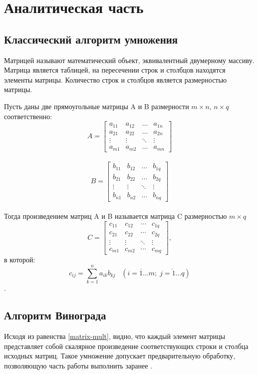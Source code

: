 \chapter{Аналитическая часть}

\section{Классический алгоритм умножения}
Матрицей называют математический объект, эквивалентный двумерному массиву. Матрица является таблицей, на пересечении строк и столбцов находятся элементы матрицы. Количество строк и столбцов является размерностью матрицы.

Пусть даны две прямоугольные матрицы A и B размерности $m \times n$, $n \times q$
соответственно:\\
$$A =  \begin{bmatrix} 
	a_{11}& a_{12} &\ldots & a_{1n}\\ 
	a_{21}& a_{22} &\ldots & a_{2n}\\ 
	\vdots& \vdots &\ddots & \vdots\\ 
	a_{m1}& a_{m2} &\ldots & a_{mn} 
\end{bmatrix} $$\\	

$$B = \begin{bmatrix} 
	b_{11}& b_{12} &\ldots & b_{1q}\\ 
	b_{21}& b_{22} &\ldots & b_{2q}\\ 
	\vdots& \vdots &\ddots & \vdots\\ 
	b_{n1}& b_{n2} &\ldots & b_{nq} 
\end{bmatrix} $$\\

Тогда произведением матриц A и B называется матрица C размерностью  $m \times q$ 
$$
	C = \begin{bmatrix} 
		c_{11} & c_{12} & \cdots & c_{1q} \\
		c_{21} & c_{22} & \cdots & c_{2q} \\ 
		\vdots & \vdots & \ddots & \vdots \\ 
		c_{m1} & c_{m2} & \cdots & c_{mq}	
	\end{bmatrix},
$$
в которой:
\begin{equation}
	\label{matrix-mult}
	c_{ij} = \sum_{k=1}^{n} a_{ik}b_{kj} \;\;\; \left(\overline{i = 1 \ldots m};\;\overline{j = 1 \ldots q} \right)
\end{equation}.

\section{Алгоритм Винограда}
Исходя из равенства \ref{matrix-mult}, видно, что каждый элемент матрицы представляет собой скалярное произведение соответствующих строки и столбца исходных матриц. Такое умножение допускает предварительную обработку, позволяющую часть работы выполнить заранее \cite{Vinograd}.

